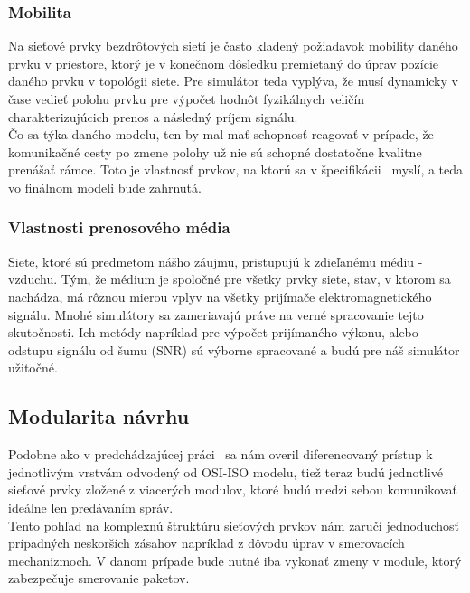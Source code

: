 \subsubsection{Mobilita}
\indent\indent Na sieťové prvky bezdrôtových sietí je často kladený požiadavok mobility daného prvku v priestore, ktorý je v konečnom dôsledku premietaný do úprav pozície daného prvku v topológii siete. Pre simulátor teda vyplýva, že musí dynamicky v čase vedieť polohu prvku pre výpočet hodnôt fyzikálnych veličín charakterizujúcich prenos a následný príjem signálu.\\
\indent Čo sa týka daného modelu, ten by mal mať schopnosť reagovať v prípade, že komunikačné cesty po zmene polohy už nie sú schopné dostatočne kvalitne prenášať rámce. Toto je vlastnosť prvkov, na ktorú sa v špecifikácii~\cite{ieee06} myslí, a teda vo finálnom modeli bude zahrnutá.
\subsubsection{Vlastnosti prenosového média}
\indent\indent Siete, ktoré sú predmetom nášho záujmu, pristupujú k zdieľanému médiu - vzduchu. Tým, že médium je spoločné pre všetky prvky siete, stav, v ktorom sa nachádza, má rôznou mierou vplyv na všetky prijímače elektromagnetického signálu. Mnohé simulátory sa zameriavajú práve na verné spracovanie tejto skutočnosti. Ich metódy napríklad pre výpočet prijímaného výkonu, alebo odstupu signálu od šumu (SNR) sú výborne spracované a budú pre náš simulátor užitočné.
\subsection{Modularita návrhu}
\indent\indent Podobne ako v predchádzajúcej práci~\cite{halas03} sa nám overil diferencovaný prístup k jednotlivým vrstvám  odvodený od OSI-ISO modelu, tiež teraz budú jednotlivé sieťové prvky zložené z viacerých modulov, ktoré budú medzi sebou komunikovať ideálne len predávaním správ.\\
\indent Tento pohľad na komplexnú štruktúru sieťových prvkov nám zaručí jednoduchosť prípadných neskorších zásahov napríklad z dôvodu úprav v smerovacích mechanizmoch. V danom prípade bude nutné iba vykonať zmeny v module, ktorý zabezpečuje smerovanie paketov.
